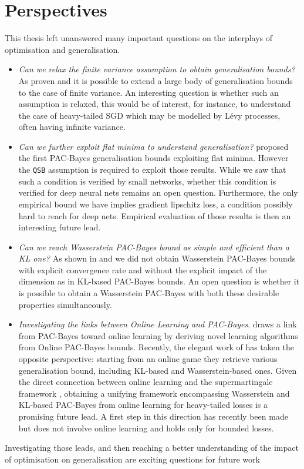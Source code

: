 \section*{Perspectives}

This thesis left unanswered many important questions on the interplays of optimisation and generalisation. 

\begin{itemize}
    \item \emph{Can we relax the finite variance assumption to obtain generalisation bounds?} As proven  and \citet{chugg2023unified} it is possible to extend a large body of generalisation bounds to the case of finite variance. An interesting question is whether such an assumption is relaxed, this would be of interest, for instance, to understand the case of heavy-tailed SGD \citep{gurbuzbalaban2020heavy} which may be modelled by Lévy processes, often having infinite variance.
    \item \emph{Can we further exploit flat minima to understand generalisation?}  proposed the first PAC-Bayes generalisation bounds exploiting flat minima. However the \texttt{QSB} assumption is required to exploit those results. While we saw that such a condition is verified by small networks, whether this condition is verified for deep neural nets remains an open question. Furthermore, the only empirical bound we have implies gradient lipschitz loss, a condition possibly hard to reach for deep nets. Empirical evaluation of those results is then an interesting future lead.
    \item \emph{Can we reach Wasserstein PAC-Bayes bound as simple and efficient than a KL one?} As shown in  and  we did not obtain Wasserstein PAC-Bayes bounds with explicit convergence rate and without the explicit impact of the dimension as in KL-based PAC-Bayes bounds. An open question is whether it is possible to obtain a Wasserstein PAC-Bayes with both these desirable properties simultaneously. 
    \item \emph{Investigating the links between Online Learning and PAC-Bayes}.  draws a link from PAC-Bayes toward online learning by deriving novel learning algorithms from Online PAC-Bayes bounds. Recently, the elegant work of \citet{lugosi2023onlinetopac} has taken the opposite perspective:  starting from an online game they retrieve various generalisation bound, including KL-based and Wasserstein-based ones. Given the direct connection between online learning and the supermartingale framework \citep{wintenberger2021stochastic}, obtaining a unifying framework encompassing Wasserstein and KL-based PAC-Bayes from online learning for heavy-tailed losses is a promising future lead. A first step in this direction has recently been made \citet{viallard2024tighter} but does not involve online learning and holds only for bounded losses. 
\end{itemize}

Investigating those leads, and then reaching a better understanding of the impact of optimisation on generalisation are exciting questions for future work\pokeball